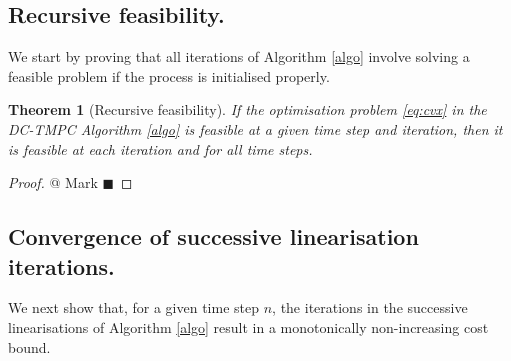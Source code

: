 \documentclass[letterpaper, 10 pt, conference]{ieeeconf}
\newtheorem{theorem}{Theorem}
\begin{document}
\subsection{Recursive feasibility.}
We start by proving that all iterations of Algorithm \ref{algo} involve solving a feasible problem if the process is initialised properly.
\begin{theorem}[Recursive feasibility]
If the optimisation problem \eqref{eq:cvx} in the DC-TMPC Algorithm \ref{algo} is feasible at a given time step and iteration, then it is feasible at each iteration and for all time steps. 
\end{theorem}
\begin{proof}
@ Mark $\blacksquare$

\end{proof}

\subsection{Convergence of successive linearisation iterations.}

We next show that, for a given time step $n$, the iterations in the successive linearisations of Algorithm \ref{algo} result
in a monotonically non-increasing cost bound.
\end{document}
